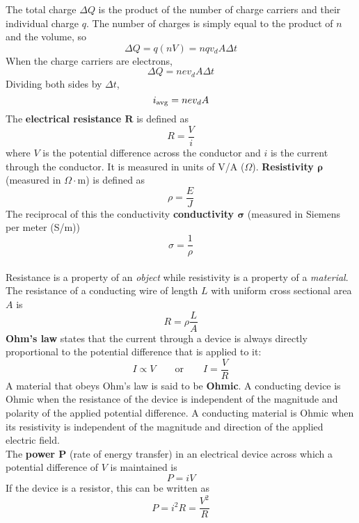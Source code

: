 \documentclass[./Electricity and Magnetism.tex]{subfiles}
\begin{document}
			The total charge \(\Delta Q\) is the product of the number of charge carriers and their individual charge \(q\). The number of charges is simply equal to the product of \(n\) and the volume, so
				\[
					\Delta Q = q(nV) 
						= nqv_dA\Delta t
				\]
				When the charge carriers are electrons,
				\[\Delta Q = nev_dA\Delta t\]
				Dividing both sides by \(\Delta t\),
				\[i_{\text{avg}} = nev_dA\]
		The \textbf{electrical resistance \(\bm{R}\)} is defined as
			\[R = \frac{V}{i} \tag{definition of \(R\)}\]
			where \(V\) is the potential difference across the conductor and \(i\) is the current through the conductor. It is measured in units of V/A (\(\Omega\)).
			\textbf{Resistivity \(\bm{\rho}\)} (measured in \(\Omega \cdot \mathrm{m}\)) is defined as
			\[\rho = \frac{E}{J} \tag{definition of \(\rho\)}\]
			The reciprocal of this the conductivity \textbf{conductivity \(\bm{\sigma}\)} (measured in Siemens per meter (S/m))
			\[\sigma = \frac{1}{\rho} \tag{definition of \(\sigma\)}\] \\
		Resistance is a property of an \textit{object} while resistivity is a property of a \textit{material}. The resistance of a conducting wire of length \(L\) with uniform cross sectional area \(A\) is
			\[R = \rho\frac{L}{A}\]
		\textbf{Ohm's law} states that the current through a device is always directly proportional to the potential difference that is applied to it:
			\[
				I \propto V \qquad \text{or} \qquad
				I = \frac{V}{R}
					\tag{Ohm's law}
			\]
			A material that obeys Ohm's law is said to be \textbf{Ohmic}. A conducting device is Ohmic when the resistance of the device is independent of the magnitude and polarity of the applied potential difference. A conducting material is Ohmic when its resistivity is independent of the magnitude and direction of the applied electric field. \\
		The \textbf{power \(\bm{P}\)} (rate of energy transfer) in an electrical device across which a potential difference of \(V\) is maintained is
			\[P = iV \tag{rate of electrical energy transfer}\]
			If the device is a resistor, this can be written as
			\[
				P = i^2R 
					= \frac{V^2}{R} 
					\tag{resistive dissipation}
			\]
\end{document}
